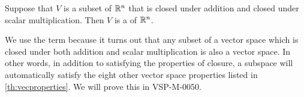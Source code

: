 \documentclass{ximera}
\begin{document}


\begin{definition}\label{def:subspace} Suppose that $V$ is a subset of $\mathbb{R}^n$ that is closed under addition and closed under scalar multiplication.  Then $V$ is a  of $\mathbb{R}^n$.
\end{definition}
We use the term  because it turns out that any subset of a vector space which is closed under both addition and scalar multiplication is also a vector space.  In other words, in addition to satisfying the properties of closure, a subspace will automatically satisfy the eight other vector space properties listed in \ref{th:vecproperties}.  We will prove this in VSP-M-0050.
\end{document}
